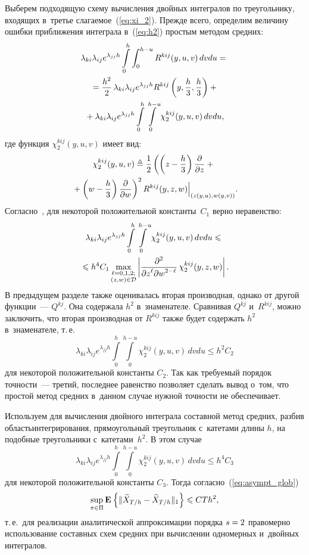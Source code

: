 \begin{multicols}{2}
Выберем подходящую схему вычисления двойных интегралов по треугольнику, 
входящих в~третье слагаемое~(\ref{eq:xi_2}).
 Прежде всего, определим величину ошибки приближения интеграла 
в~(\ref{eq:h2}) простым методом средних:
 \begin{multline*} %
 \lambda_{k i}\lambda_{i j} e^{\lambda_{jj}h}
\int\limits_0^{h} \int_0^{h-u} R^{kij}(y,u,v)\,dvdu ={}\\
{}= \fr{h^2}{2}\,
\lambda_{k i}\lambda_{i j} e^{\lambda_{jj}h}
R^{kij}\left(y,\fr{h}{3},\fr{h}{3}\right)+{} \\ %
{}+\lambda_{k i}\lambda_{i j} e^{\lambda_{jj}h} \int\limits_0^{h} 
\int\limits_0^{h-u}\chi_2^{kij}(y,u,v)\,dvdu,
 \end{multline*}
где функция $\chi_2^{kij}(y,u,v)$ имеет вид:
\begin{multline*} %
\chi_2^{kij}(y,u,v)\triangleq
\fr{1}{2}
\left(\left(z-\fr{h}{3}\right)\fr{\partial}{\partial z}+{}\right.\\
\left.{}+\left(w-
\fr{h}{3}\right)\fr{\partial}{\partial w}
\right)^2R^{kij}(y,z,w)\Bigl|_{(z(y,u),w(y,v))}.
\end{multline*}
Согласно~\cite{IK_94}, для некоторой положительной константы~$C_1$ верно 
неравенство:
 \begin{multline*} %
\lambda_{k i}\lambda_{i j} e^{\lambda_{jj}h} \int\limits_0^{h} 
\int\limits_0^{h-u}\chi_2^{kij}(y,u,v)\,dvdu \leqslant{}\\
{}\leqslant h^4C_1
\max\limits_{\substack{{\ell=0,1,2;}\\ { (z,w) \in \mathcal{D}}}}
\left|\fr{\partial^2}{\partial z^{\ell}\partial w^{2-
\ell}}\,\chi_2^{kij}(y,z,w)\right|.
 \end{multline*}
 В предыдущем разделе также оценивалась вторая производная, однако от 
другой функции~--- $Q^{kj}$. Она содержала $h^2$ в~знаменателе. Сравнивая 
$Q^{kj}$ и~$R^{kij}$, можно заключить, что вторая производная от 
$R^{kij}$ также будет содержать $h^2$ в~знаменателе, т.\,е.
 $$
 \lambda_{k i}\lambda_{i j} e^{\lambda_{jj}h} \int\limits_0^{h} 
 \int\limits_0^{h-u}\chi_2^{kij}(y,u,v)\,dvdu \leqslant h^2C_2
 $$
 для некоторой положительной константы $C_2$. Так как требуемый порядок 
точности~--- третий, последнее равенство позволяет сделать вывод о~том, 
что простой метод средних в~данном случае нужной точности не 
обеспечивает.

 Используем для вычисления двойного интег\-рала составной метод средних, 
разбив область\linebreak интегрирования, прямоугольный треугольник с~катетами длины 
$h$, на подобные треугольники с~катетами~$h^2$. В этом случае
 $$
\lambda_{k i}\lambda_{i j} e^{\lambda_{jj}h} \int\limits_0^{h} 
\int\limits_0^{h-u}\chi_2^{kij}(y,u,v)\,dvdu \leqslant h^4 C_3
 $$
 для некоторой положительной константы $C_3$. Тогда 
согласно~(\ref{eq:asympt_glob})
 $$
\sup\limits_{\pi \in \Pi}\mathbf{E}_{  }\left\{ \mathop{\|\widetilde{X}_{T/h} - 
\widehat{X}_{T/h}\|_1} \right\} \leqslant CTh^2,
$$
 т.\,е.\ для реализации аналитической аппроксимации порядка $s\hm=2$ 
правомерно использование составных схем средних при вычислении одномерных 
и~двойных интегралов.


\end{multicols}
